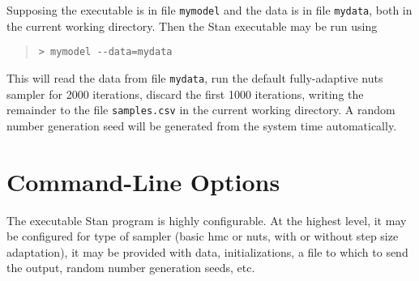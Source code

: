 \documentclass[10pt]{report}
\newcommand{\Stan}{Stan\xspace}
\newcommand{\acronym}[1]{{\sc #1}\xspace}
\newcommand{\HMC}{\acronym{hmc}}
\newcommand{\NUTS}{\acronym{nuts}}
\newcommand{\code}[1]{{\tt #1}}
\begin{document}
Supposing the executable is in file \code{mymodel} and the data
is in file \code{mydata}, both in the current working directory.
Then the \Stan executable may be run using
%
\begin{quote}
\begin{Verbatim}
> mymodel --data=mydata
\end{Verbatim}
\end{quote}
%
This will read the data from file \code{mydata}, run the default
fully-adaptive \NUTS sampler for 2000 iterations, discard the first
1000 iterations, writing the remainder to the file \code{samples.csv}
in the current working directory.  A random number generation seed
will be generated from the system time automatically.

\section{Command-Line Options}

The executable \Stan program is highly configurable.  At the highest
level, it may be configured for type of sampler (basic \HMC or \NUTS,
with or without step size adaptation), it may be provided with
data, initializations, a file to which to send the output, random
number generation seeds, etc.  
\end{document}
